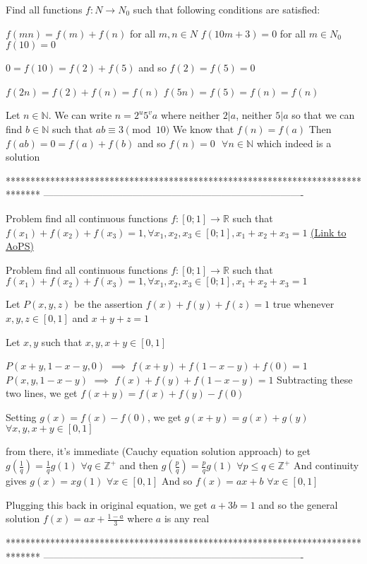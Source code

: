 \begin{solution}
	\begin{tcolorbox}Find all functions $f:N \to N_0$ such that following conditions are satisfied:

$f(mn)=f(m)+f(n)$ for all  $m,n\in N$
$f(10m+3)=0$ for all $m\in N_0$
$f(10)=0$\end{tcolorbox}
$0=f(10)=f(2)+f(5)$ and so $f(2)=f(5)=0$

$f(2n)=f(2)+f(n)=f(n)$
$f(5n)=f(5)=f(n)=f(n)$

Let $n\in \mathbb N$. We can write $n=2^u5^va$ where neither $2|a$, neither $5|a$ so that we can find $b\in\mathbb N$ such that $ab\equiv 3\pmod{10}$
We know that $f(n)=f(a)$
Then $f(ab)=0=f(a)+f(b)$ and so $\boxed{f(n)=0\text{    }\forall n\in\mathbb N}$ which indeed is a solution
\end{solution}
*******************************************************************************
-------------------------------------------------------------------------------

\begin{problem}
	Problem
 find all continuous  functions  $f:[0;1]\to\mathbb{R}$ such that $f(x_1)+f(x_2)+f(x_3)=1,
\forall x_1,x_2,x_{3}\in [0;1],x_1+x_2+x_3=1$
	\flushright \href{https://artofproblemsolving.com/community/c6h527098}{(Link to AoPS)}
\end{problem}



\begin{solution}
	\begin{tcolorbox}Problem
 find all continuous  functions  $f:[0;1]\to\mathbb{R}$ such that $f(x_1)+f(x_2)+f(x_3)=1,
\forall x_1,x_2,x_{3}\in [0;1],x_1+x_2+x_3=1$\end{tcolorbox}
Let $P(x,y,z)$ be the assertion $f(x)+f(y)+f(z)=1$ true whenever $x,y,z\in[0,1]$ and $x+y+z=1$

Let $x,y$ such that $x,y,x+y\in[0,1]$

$P(x+y,1-x-y,0)$ $\implies$ $f(x+y)+f(1-x-y)+f(0)=1$
$P(x,y,1-x-y)$ $\implies$ $f(x)+f(y)+f(1-x-y)=1$
Subtracting these two lines, we get $f(x+y)=f(x)+f(y)-f(0)$

Setting $g(x)=f(x)-f(0)$, we get $g(x+y)=g(x)+g(y)$ $\forall x,y,x+y\in[0,1]$

from there, it's immediate (Cauchy equation solution approach) to get $g(\frac 1q)=\frac 1qg(1)$ $\forall q\in\mathbb Z^+$ and then  $g(\frac pq)=\frac pqg(1)$ $\forall p\le q\in\mathbb Z^+$
And continuity gives $g(x)=xg(1)$ $\forall x\in[0,1]$
And so $f(x)=ax+b$ $\forall x\in[0,1]$

Plugging this back in original equation, we get $a+3b=1$ and so the general solution $\boxed{f(x)=ax+\frac{1-a}3}$ where $a$ is any real
\end{solution}
*******************************************************************************
-------------------------------------------------------------------------------

